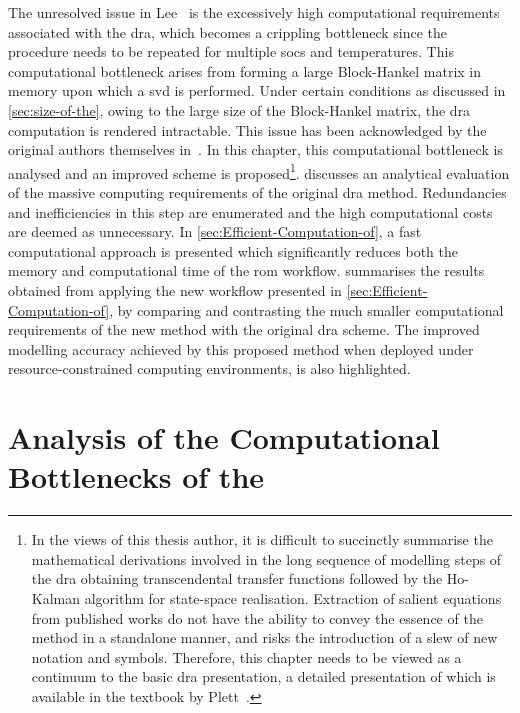 The  unresolved  issue in  Lee~\etal{}  is  the excessively  high  computational
requirements associated with the \gls{dra}, which becomes a crippling bottleneck
since  the  procedure  needs  to   be  repeated  for  multiple  \glspl{soc}  and
temperatures.  This  computational  bottleneck   arises  from  forming  a  large
Block-Hankel  matrix  in memory  upon  which  a  \gls{svd} is  performed.  Under
certain conditions  as discussed in  \cref{sec:size-of-the}, owing to  the large
size  of  the  Block-Hankel  matrix,   the  \gls{dra}  computation  is  rendered
intractable. This issue has been acknowledged by the original authors themselves
in~\cite{Lee2012,Plett2015}.  In  this  chapter, this  computational  bottleneck
is  analysed  and an  improved  scheme  is proposed\footnote{In the views of
    this thesis author, it is difficult to succinctly summarise the mathematical
    derivations involved in the long sequence of modelling steps  of the
    \gls{dra} \ie{} obtaining transcendental transfer functions followed by the
    Ho-Kalman algorithm for state-space realisation. Extraction of salient
    equations from published works do not have the ability to convey the essence
    of the method in a standalone manner, and risks the introduction of a slew
    of new notation and symbols. Therefore, this chapter needs to be viewed as a
    continuum to the basic \gls{dra} presentation, a detailed presentation of
which is available in the textbook by Plett~\cite{Plett2015}.}.  
discusses an analytical evaluation of  the massive computing requirements of
the original  \gls{dra} method.  Redundancies and  inefficiencies in  this
step  are enumerated  and the high  computational  costs are  deemed  as
unnecessary.  In \cref{sec:Efficient-Computation-of}, a fast  computational
approach is presented which  significantly reduces  both  the  memory and
computational time of  the \gls{rom}  workflow. 
summarises  the  results obtained  from applying the  new workflow presented
in  \cref{sec:Efficient-Computation-of}, by comparing and contrasting the
much smaller computational requirements of the new method  with the
original  \gls{dra} scheme.  The  improved modelling  accuracy achieved  by
this  proposed  method when  deployed  under  resource-constrained computing
environments, is also highlighted.

\section{Analysis of the Computational Bottlenecks of the }\label{sec:Analysis-of-the}

